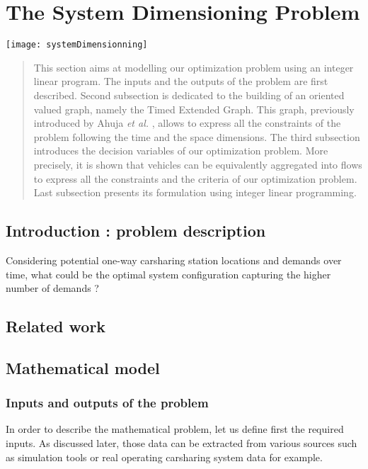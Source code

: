 \chapter{The System Dimensioning Problem} \label{chap:sdp}
\begin{bibunit}[ieeetr]
\minitoc
\vspace{2cm}

\begin{minipage}[c]{0.3\linewidth}
\texttt{[image: systemDimensionning]}
\end{minipage}
\hfill
\begin{minipage}[c]{0.7\linewidth}
\begin{abstract}
This section aims at modelling our optimization problem using an integer linear program.
The inputs and the outputs of the problem are first described.
Second subsection is dedicated to the building of an oriented valued graph, namely the Timed Extended Graph. This graph, previously introduced by  Ahuja {\em et al.} \cite{ahujaNetwork1993}, allows to express all the constraints of the problem following the time and the space dimensions.
The third subsection introduces the decision variables of our optimization problem. More precisely, it is shown that vehicles can be equivalently aggregated into flows to express all the constraints and the criteria of our optimization problem.
Last subsection presents its formulation using integer linear programming.
\end{abstract}
\end{minipage}

\newpage
\section{Introduction : problem description}
Considering potential one-way carsharing station locations and demands over time, what could be the optimal system configuration capturing the higher number of demands ?



\newpage
\section{Related work}


\newpage
\section{Mathematical model}
\subsection{Inputs and outputs of the problem}
In order to describe the mathematical problem, let us define first the required inputs.
As discussed later, those data can be extracted from various sources such as simulation tools or real operating carsharing system data for example. 


\end{bibunit}
